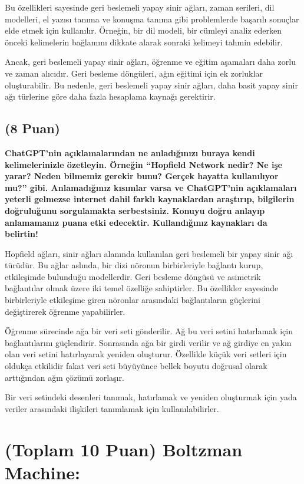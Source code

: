 \documentclass[11pt]{article}
\begin{document}
\begin{dialogue}
Bu özellikleri sayesinde geri beslemeli yapay sinir ağları, zaman serileri, dil modelleri, el yazısı tanıma ve konuşma tanıma gibi problemlerde başarılı sonuçlar elde etmek için kullanılır. Örneğin, bir dil modeli, bir cümleyi analiz ederken önceki kelimelerin bağlamını dikkate alarak sonraki kelimeyi tahmin edebilir.

Ancak, geri beslemeli yapay sinir ağları, öğrenme ve eğitim aşamaları daha zorlu ve zaman alıcıdır. Geri besleme döngüleri, ağın eğitimi için ek zorluklar oluşturabilir. Bu nedenle, geri beslemeli yapay sinir ağları, daha basit yapay sinir ağı türlerine göre daha fazla hesaplama kaynağı gerektirir.
\end{dialogue}
\newpage
\subsection{(8 Puan)} \textbf{ChatGPT’nin açıklamalarından ne anladığınızı buraya kendi kelimelerinizle özetleyin. Örneğin ``Hopfield Network nedir? Ne işe yarar? Neden bilmemiz gerekir bunu? Gerçek hayatta kullanılıyor mu?'' gibi. Anlamadığınız kısımlar varsa ve ChatGPT’nin açıklamaları yeterli gelmezse internet dahil farklı kaynaklardan araştırıp, bilgilerin doğruluğunu sorgulamakta serbestsiniz. Konuyu doğru anlayıp anlamamanız puana etki edecektir. Kullandığınız kaynakları da belirtin!}

Hopfield ağları, sinir ağları alanında kullanılan geri beslemeli bir yapay sinir ağı türüdür. Bu ağlar aslında, bir dizi nöronun birbirleriyle bağlantı kurup, etkileşimde bulunduğu modellerdir. Geri besleme döngüsü ve asimetrik bağlantılar olmak üzere iki temel özelliğe sahiptirler. Bu özellikler sayesinde birbirleriyle etkileşime giren nöronlar arasındaki bağlantıların güçlerini değiştirerek öğrenme yapabilirler.

Öğrenme sürecinde ağa bir veri seti gönderilir. Ağ bu veri setini hatırlamak için bağlantılarını güçlendirir. Sonrasında ağa bir girdi verilir ve ağ girdiye en yakın olan veri setini hatırlayarak yeniden oluşturur. Özellikle küçük veri setleri için oldukça etkilidir fakat veri seti büyüyünce bellek boyutu doğrusal olarak arttığından ağın çözümü zorlaşır. 

Bir veri setindeki desenleri tanımak, hatırlamak ve yeniden oluşturmak için yada veriler arasındaki ilişkileri tanımlamak için kullanılabilirler. 

\section{(Toplam 10 Puan) Boltzman Machine:}
\end{document}
